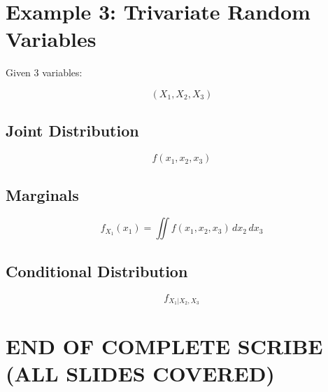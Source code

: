 \documentclass[12pt]{article}
\begin{document}
\section*{Example 3: Trivariate Random Variables}

Given 3 variables:

\[
(X_1, X_2, X_3)
\]

\subsection*{Joint Distribution}

\[
f(x_1, x_2, x_3)
\]

\subsection*{Marginals}

\[
f_{X_1}(x_1) = \iint f(x_1,x_2,x_3)\,dx_2\,dx_3
\]

\subsection*{Conditional Distribution}

\[
f_{X_1|X_2,X_3}
\]

\section*{END OF COMPLETE SCRIBE (ALL SLIDES COVERED)}
\end{document}
